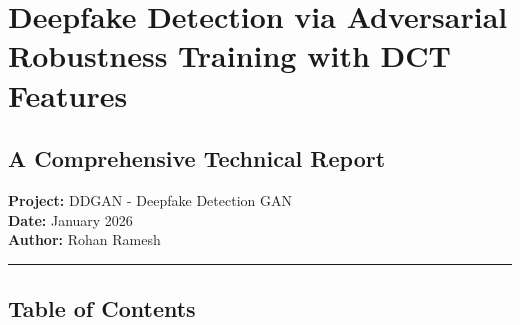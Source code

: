 \section{Deepfake Detection via Adversarial Robustness Training with DCT
Features}\label{deepfake-detection-via-adversarial-robustness-training-with-dct-features}

\subsection{A Comprehensive Technical
Report}\label{a-comprehensive-technical-report}

\textbf{Project:} DDGAN - Deepfake Detection GAN\\
\textbf{Date:} January 2026\\
\textbf{Author:} Rohan Ramesh

\begin{center}\rule{0.5\linewidth}{0.5pt}\end{center}

\subsection{Table of Contents}\label{table-of-contents}

